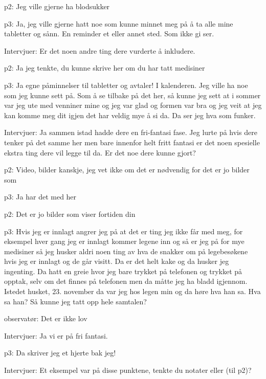 \documentclass[11pt,UKenglish, a4paper]{article}
\begin{document}
\textcolor{myYellow} {p2:} Jeg ville gjerne ha blodsukker

\textcolor{myR} {p3:} Ja, jeg ville gjerne hatt noe som kunne minnet meg på å ta alle mine tabletter og sånn. En reminder et eller annet sted. Som ikke gi ser.

\textcolor{myBlue} {Intervjuer:} Er det noen andre ting dere vurderte å inkludere.

\textcolor{myYellow} {p2:} Ja jeg tenkte, du kunne skrive her om du har tatt medisiner

\textcolor{myR} {p3:} Ja egne påminnelser til tabletter og avtaler! I kalenderen. Jeg ville ha noe som jeg kunne sett på. Som å se tilbake på det her, så kunne jeg sett at i sommer var jeg ute med venniner mine og jeg var glad og formen var bra og jeg veit at jeg kan komme meg dit igjen det har veldig mye å si da. Da ser jeg hva som funker.

\textcolor{myBlue} {Intervjuer:} Ja sammen istad hadde dere en fri-fantasi fase. Jeg lurte på hvis dere tenker på det samme her men bare innenfor helt fritt fantasi er det noen spesielle ekstra ting dere vil legge til da. Er det noe dere kunne gjort?

\textcolor{myYellow} {p2:} Video, bilder kanskje, jeg vet ikke om det er nødvendig for det er jo bilder som

\textcolor{myR} {p3:} Ja har det med her

\textcolor{myYellow} {p2:} Det er jo bilder som viser fortiden din

\textcolor{myR} {p3:} Hvis jeg er innlagt angrer jeg på at det er ting jeg ikke får med meg, for eksempel hver gang jeg er innlagt kommer legene inn og så er jeg på for mye medisiner så jeg husker aldri noen ting av hva de snakker om på legebesøkene hvis jeg er innlagt og de går visitt. Da er det helt kake og da husker jeg ingenting. Da hatt en greie hvor jeg bare trykket på telefonen og trykket på opptak, selv om det finnes på telefonen men da måtte jeg ha bladd igjennom. Istedet husket, 23. november da var jeg hos legen min og da høre hva han sa. Hva sa han? Så kunne jeg tatt opp hele samtalen?

observatør: Det er ikke lov

\textcolor{myBlue} {Intervjuer:} Ja vi er på fri fantasi.

\textcolor{myR} {p3:} Da skriver jeg et hjerte bak jeg!

\textcolor{myBlue} {Intervjuer:} Et eksempel var på disse punktene, tenkte du notater eller (til p2)?
\end{document}
